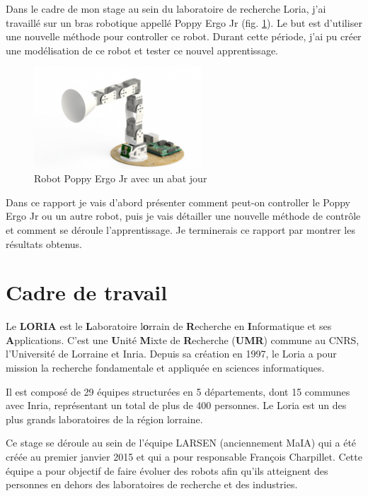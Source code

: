 \documentclass[11pt,french]{report}
\begin{document}
Dans le cadre de mon stage au sein du laboratoire de recherche Loria, j'ai travaillé sur un bras robotique appellé Poppy Ergo Jr (fig. \ref{fig:PoppyErgoJr}).
Le but est d'utiliser une nouvelle méthode pour controller ce robot.
Durant cette période, j'ai pu créer une modélisation de ce robot et tester ce nouvel apprentissage.

\phantom{INVISIBLE LINE}

\begin{figure}
    \centering
    \includegraphics[width=178pt]{Robot_Poppy_Ergo_Jr_abat_jour} 
    \caption{Robot Poppy Ergo Jr avec un abat jour}
    \label{fig:PoppyErgoJr}
\end{figure}

Dans ce rapport je vais d'abord présenter comment peut-on controller le Poppy Ergo Jr ou un autre robot, puis je vais détailler une nouvelle méthode de contrôle et comment se déroule l'apprentissage.
Je terminerais ce rapport par montrer les résultats obtenus.

\chapter{Cadre de travail}

Le \textbf{LORIA} est le \textbf{L}aboratoire l\textbf{o}rrain de \textbf{R}echerche en \textbf{I}nformatique et ses \textbf{A}pplications.
C'est une \textbf{U}nité \textbf{M}ixte de \textbf{R}echerche (\textbf{UMR}) commune au CNRS, l'Université de Lorraine et Inria.
Depuis sa création en 1997, le Loria a pour mission la recherche fondamentale et appliquée en sciences informatiques.

Il est composé de 29 équipes structurées en 5 départements, dont 15 communes avec Inria, représentant un total de plus de 400 personnes.
Le Loria est un des plus grands laboratoires de la région lorraine.

\phantom{INVISIBLE LINE}

Ce stage se déroule au sein de l’équipe LARSEN (anciennement MaIA) qui a été créée au premier janvier 2015 et qui a pour responsable François Charpillet.
Cette équipe a pour objectif de faire évoluer des robots afin qu'ils atteignent des personnes en dehors des laboratoires de recherche et des industries.
\end{document}
